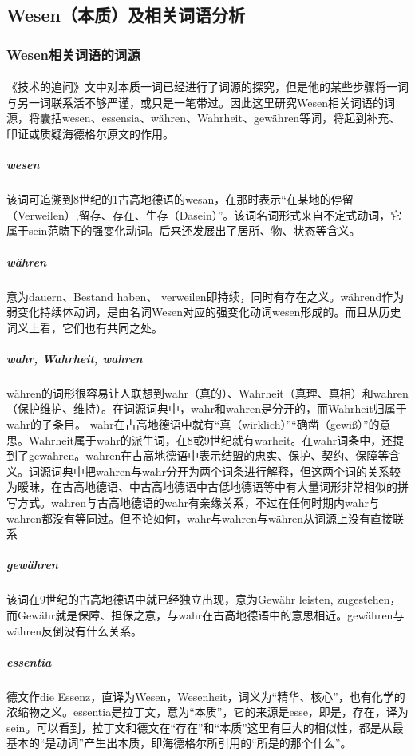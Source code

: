 \documentclass{article}
\begin{document}
	\subsection{Wesen（本质）及相关词语分析}
		\subsubsection{Wesen相关词语的词源}
			\paragraph{}
		《技术的追问》文中对本质一词已经进行了词源的探究，但是他的某些步骤将一词与另一词联系活不够严谨，或只是一笔带过。因此这里研究Wesen相关词语的词源，将囊括wesen、essensia、währen、Wahrheit、gewähren等词，将起到补充、印证或质疑海德格尔原文的作用。
			\paragraph{}
			\subparagraph{wesen}
			该词可追溯到8世纪的1古高地德语的wesan，在那时表示“在某地的停留（Verweilen）,留存、存在、生存（Dasein）”。该词名词形式来自不定式动词，它属于sein范畴下的强变化动词。后来还发展出了居所、物、状态等含义。
			\subparagraph{währen}意为dauern、Bestand haben、 verweilen即持续，同时有存在之义。während作为弱变化持续体动词，是由名词Wesen对应的强变化动词wesen形成的。而且从历史词义上看，它们也有共同之处。
			\subparagraph{wahr, Wahrheit, wahren}
			währen的词形很容易让人联想到wahr（真的）、Wahrheit（真理、真相）和wahren（保护维护、维持）。在词源词典中，wahr和wahren是分开的，而Wahrheit归属于wahr的子条目。
wahr在古高地德语中就有“真（wirklich）”“确凿（gewiß）”的意思。Wahrheit属于wahr的派生词，在8或9世纪就有warheit。在wahr词条中，还提到了gewähren。wahren在古高地德语中表示结盟的忠实、保护、契约、保障等含义。词源词典中把wahren与wahr分开为两个词条进行解释，但这两个词的关系较为暧昧，在古高地德语、中古高地德语中古低地德语等中有大量词形非常相似的拼写方式。wahren与古高地德语的wahr有亲缘关系，不过在任何时期内wahr与wahren都没有等同过。但不论如何，wahr与wahren与währen从词源上没有直接联系
			\subparagraph{gewähren}
			该词在9世纪的古高地德语中就已经独立出现，意为Gewähr leisten, zugestehen，而Gewähr就是保障、担保之意，与wahr在古高地德语中的意思相近。gewähren与währen反倒没有什么关系。
			\subparagraph{essentia}
			德文作die Essenz，直译为Wesen，Wesenheit，词义为“精华、核心”，也有化学的浓缩物之义。essentia是拉丁文，意为“本质”，它的来源是esse，即是，存在，译为sein。可以看到，拉丁文和德文在“存在”和“本质”这里有巨大的相似性，都是从最基本的“是动词”产生出本质，即海德格尔所引用的“所是的那个什么”。
\end{document}
